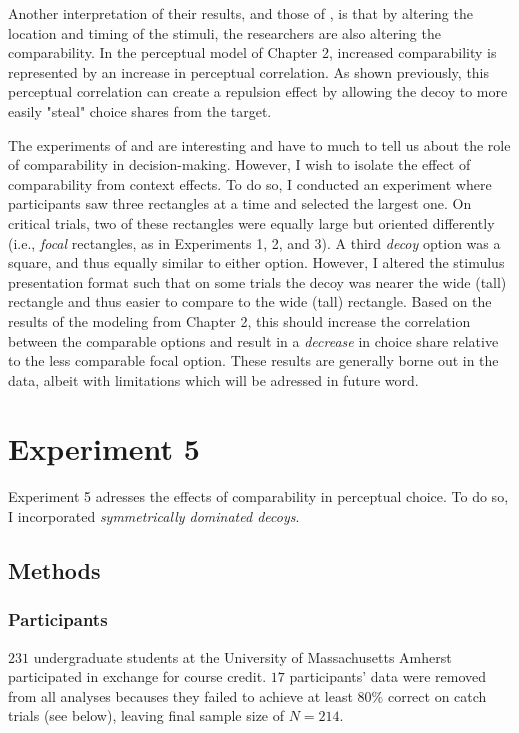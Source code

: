 Another interpretation of their results, and those of \textcite{trueblood2022attentional}, is that by altering the location and timing of the stimuli, the researchers are also altering the comparability. In the perceptual model of Chapter 2, increased comparability is represented by an increase in perceptual correlation. As shown previously, this perceptual correlation can create a repulsion effect by allowing the decoy to more easily "steal" choice shares from the target.

The experiments of \textcite{evansImpactPresentationOrder2021} and \textcite{trueblood2015fragile} are interesting and have to much to tell us about the role of comparability in decision-making. However, I wish to isolate the effect of comparability from context effects. To do so, I conducted an experiment where participants saw three rectangles at a time and selected the largest one. On critical trials, two of these rectangles were equally large but oriented differently (i.e., \textit{focal} rectangles, as in Experiments 1, 2, and 3). A third \textit{decoy} option was a square, and thus equally similar to either option. However, I altered the stimulus presentation format such that on some trials the decoy was nearer the wide (tall) rectangle and thus easier to compare to the wide (tall) rectangle. Based on the results of the modeling from Chapter 2, this should increase the correlation between the comparable options and result in a \textit{decrease} in choice share relative to the less comparable focal option. These results are generally borne out in the data, albeit with limitations which will be adressed in future word.

\section{Experiment 5}
Experiment 5 adresses the effects of comparability in perceptual choice. To do so, I incorporated \textit{symmetrically dominated decoys}.

\subsection{Methods}

\subsubsection{Participants}
$231$ undergraduate students at the University of Massachusetts Amherst participated in exchange for course credit. $17$ participants' data were removed from all analyses becauses they failed to achieve at least $80\%$ correct on catch trials (see below), leaving final sample size of $N=214$. 








